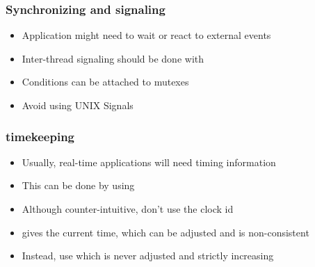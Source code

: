 \begin{frame}
        \frametitle{Synchronizing and signaling}
        \begin{itemize}
                \item Application might need to wait or react to external events
                \item Inter-thread signaling should be done with 
                \item Conditions can be attached to mutexes
                \item Avoid using UNIX Signals
        \end{itemize}
\end{frame}

\begin{frame}
        \frametitle{timekeeping}
        \begin{itemize}
                \item Usually, real-time applications will need timing information
                \item This can be done by using 
                \item Although counter-intuitive, don't use the  clock id
                \item {} gives the current time, which can be adjusted and is non-consistent
                \item Instead, use  which is never adjusted and strictly increasing
        \end{itemize}
\end{frame}
